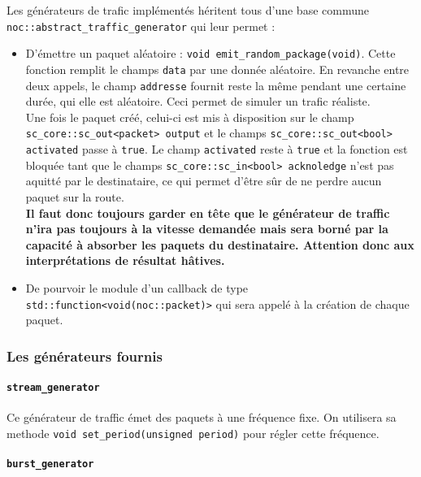 \documentclass[11pt]{article}
\begin{document}
\vspace{0.5cm}

Les générateurs de trafic implémentés héritent tous d'une base commune \\
\texttt{noc::abstract\_traffic\_generator} qui leur permet :
\begin{itemize}
  \item D'émettre un paquet aléatoire : \texttt{void
    emit\_random\_package(void)}. Cette fonction remplit le champs \texttt{data}
    par une donnée aléatoire. En revanche entre deux appels, le champ
    \texttt{addresse} fournit reste la même pendant une certaine durée, qui elle
    est aléatoire. Ceci permet de simuler un trafic réaliste. \\
    Une fois le paquet créé, celui-ci est mis à disposition sur le champ
    \texttt{sc\_core::sc\_out<packet> output} et le champs
    \texttt{sc\_core::sc\_out<bool> activated} passe à \texttt{true}. Le champ
    \texttt{activated} reste à \texttt{true} et la fonction est bloquée tant que le champs
    \texttt{sc\_core::sc\_in<bool> acknoledge} n'est pas aquitté par le
    destinataire, ce qui permet d'être sûr de ne perdre aucun paquet sur la
    route. \\
    \textbf{Il faut donc toujours garder en tête que le générateur de traffic n'ira pas toujours
      à la vitesse demandée mais sera borné par la capacité à absorber les
      paquets du destinataire. Attention donc aux interprétations de résultat
    hâtives.}
  \item De pourvoir le module d'un callback de type
    \texttt{std::function<void(noc::packet)>} qui sera appelé à la création de
    chaque paquet.
\end{itemize}

\subsubsection{Les générateurs fournis}

\paragraph{\texttt{stream\_generator} \\}

Ce générateur de traffic émet des paquets à une fréquence fixe. On utilisera sa
methode \texttt{void set\_period(unsigned period)} pour régler cette fréquence.

\paragraph{\texttt{burst\_generator} \\}
\end{document}
